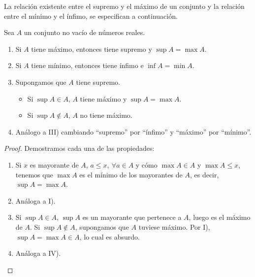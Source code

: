 La relación existente entre el supremo y el máximo de un conjunto y la relación entre el mínimo y el ínfimo,
se especifican a continuación.
\begin{prop}
    Sea $A$ un conjunto no vacío de números reales.
    \begin{enumerate}
        \item Si $A$ tiene máximo, entonces tiene supremo y $\sup A = \max A$.

        \item Si $A$ tiene mínimo, entonces tiene ínfimo e $\inf A = \min A$.

        \item Supongamos que $A$ tiene supremo.
        \begin{itemize}
            \item Si $\sup A \in A$, $A$ tiene máximo y $\sup A = \max A$.

            \item Si $\sup A \notin A$, $A$ no tiene máximo.
        \end{itemize}

        \item Análogo a III) cambiando ``supremo'' por ``ínfimo'' y ``máximo'' por ``mínimo''.
    \end{enumerate}
\end{prop}
\begin{proof} Demostramos cada una de las propiedades:
    \begin{enumerate}
        \item Si $x$ es mayorante de $A$, $a \leq x,~\forall a \in A$ y cómo $\max A \in A$ y $\max A \leq x$, tenemos que $\max A$ es el mínimo de los mayorantes de $A$, es decir, $\sup A = \max A$.

        \item Análoga a I).

        \item Si $\sup A \in A$, $\sup A$ es un mayorante que pertenece a $A$, luego es el máximo de $A$. Si $\sup A \notin A$, supongamos que $A$ tuviese máximo. Por I), $\sup A = \max A \in A$, lo cual es absurdo.

        \item Análoga a IV).
    \end{enumerate}
\end{proof}

